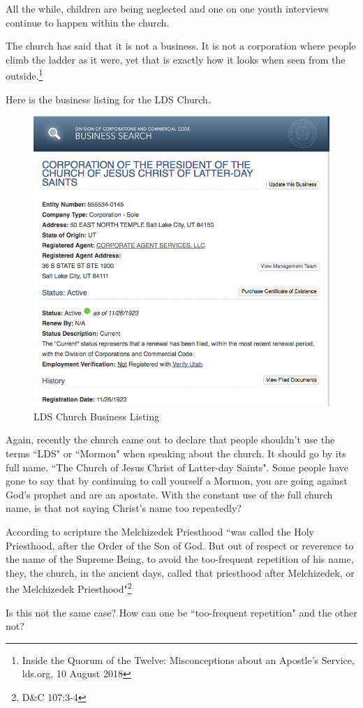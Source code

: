 All the while, children are being neglected and one on one youth interviews continue 
to happen within the church.

The church has said that it is not a business. It is not a corporation where people
climb the ladder as it were, yet that is exactly how it looks when seen from the
outside.\footnote{Inside the Quorum of the Twelve: Misconceptions about an Apostle's
Service, lds.org, 10 August 2018}

Here is the business listing for the LDS Church.

\begin{figure}[h!]
  \centering
  \includegraphics[width=1\linewidth]{articles/images/business.png}
  \caption{LDS Church Business Listing}
  \label{fig:tas1}
\end{figure}

Again, recently the church came out to declare that people shouldn't use the terms
``LDS" or ``Mormon" when speaking about the church. It should go by its full name.
``The Church of Jesus Christ of Latter-day Saints". Some people have gone to say that
by continuing to call yourself a Mormon, you are going against God's prophet and are
an apostate. With the constant use of the full church name, is that not saying
Christ's name too repeatedly?

According to scripture the Melchizedek Priesthood ``was called the Holy Priesthood, 
after the Order of the Son of God. But out of respect or reverence to the name of 
the Supreme Being, to avoid the too-frequent repetition of his name, 
they, the church, in the ancient days, called that priesthood after 
Melchizedek, or the Melchizedek Priesthood"\footnote{D\&C 107:3-4}

Is this not the same case? How can one be ``too-frequent repetition" and the other 
not?